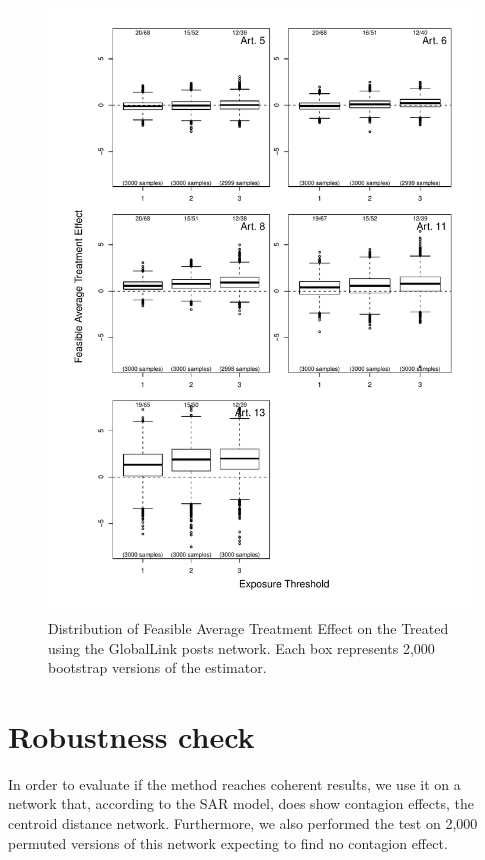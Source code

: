 \documentclass[10pt]{article}
\begin{document}
\begin{figure}[H]
	\centering
	\includegraphics[width=.8\linewidth]{../fig/matching_bloxplot_adjmat_referrals.pdf}
	\caption{Distribution of Feasible Average Treatment Effect on the Treated using the GlobalLink posts network. Each box represents 2,000 bootstrap versions of the estimator.}
\end{figure}

\section{Robustness check}

In order to evaluate if the method reaches coherent results, we use it on a network
that, according to the SAR model, does show contagion effects, the centroid distance
network. Furthermore, we also performed the test on 2,000 permuted versions of this
network expecting to find no contagion effect.
\end{document}
